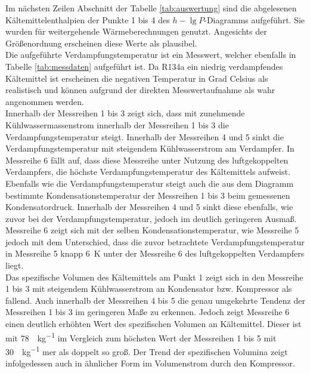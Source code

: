 Im nächsten Zeilen Abschnitt der Tabelle \ref{tab:auswertung} sind die abgelesenen Kältemittelenthalpien der Punkte 1 bis 4 des $h-\lg{P}$-Diagramms aufgeführt. Sie wurden für weitergehende Wärmeberechnungen genutzt. Angesichts der Größenordnung erscheinen diese Werte als plausibel.\\

Die aufgeführte Verdampfungstemperatur ist ein Messwert, welcher ebenfalls in Tabelle \ref{tab:messdaten} aufgeführt ist. Da R134a ein niedrig verdampfendes Kältemittel ist erscheinen die negativen Temperatur in Grad Celsius als realistisch und können aufgrund der direkten Messwertaufnahme als wahr angenommen werden.\\
Innerhalb der Messreihen 1 bis 3 zeigt sich, dass mit zunehmende Kühlwassermassenstrom innerhalb der Messreihen 1 bis 3 die Verdampfungstemperatur steigt. Innerhalb der Messreihen 4 und 5 sinkt die Verdampfungstemperatur mit steigendem Kühlwasserstrom am Verdampfer. In Messreihe 6 fällt auf, dass diese Messreihe unter Nutzung des luftgekoppelten Verdampfers, die höchste Verdampfungstemperatur des Kältemittels aufweist.\\

Ebenfalls wie die Verdampfungstemperatur steigt auch die aus dem Diagramm bestimmte Kondensationstemperatur der Messreihen 1 bis 3 beim gemessenen Kondensatordruck. Innerhalb der Messreihen 4 und 5 sinkt diese ebenfalls, wie zuvor bei der Verdampfungstemperatur, jedoch im deutlich geringeren Ausmaß. Messreihe 6 zeigt sich mit der selben Kondensationstemperatur, wie Messreihe 5 jedoch mit dem Unterschied, dass die zuvor betrachtete Verdampfungstemperatur in Messreihe 5 knapp \SI{6}{\kelvin} unter der Messreihe 6 des luftgekoppelten Verdampfers liegt.\\

Das spezifische Volumen des Kältemittels am Punkt 1 zeigt sich in den Messreihe 1 bis 3 mit steigendem Kühlwasserstrom an Kondensator bzw. Kompressor als fallend. Auch innerhalb der Messreihen 4 bis 5 die genau umgekehrte Tendenz der Messreihen 1 bis 3 im geringeren Maße zu erkennen. Jedoch zeigt Messreihe 6 einen deutlich erhöhten Wert des spezifischen Volumen an Kältemittel. Dieser ist mit \SI{78}{\kmeter \per \kg} im Vergleich zum höchsten Wert der Messreihen 1 bis 5 mit \SI{30}{\kmeter \per \kg} mer als doppelt so groß.
Der Trend der spezifischen Volumina zeigt infolgedessen auch in ähnlicher Form im Volumenstrom durch den Kompressor.\\

